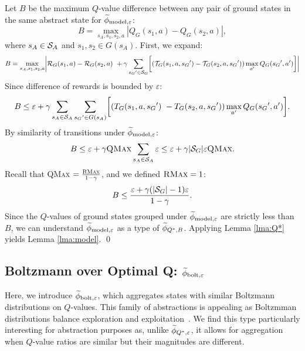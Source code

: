 Let $B$ be the maximum $Q$-value difference between any pair of ground states in the same abstract state for $\widetilde \phi_{\text{model},\varepsilon}$:
\begin{equation*}
B = \max_{s_A, s_1, s_2, a}  |Q_G(s_1, a) - Q_G(s_2, a)|,
\end{equation*}
where $s_A \in \mathcal{S}_A$ and $s_1, s_2 \in G(s_A)$. First, we expand:
\begin{equation}
B=\max_{s_A, s_1, s_2, a}      \biggl|\mathcal{R}_G(s_1, a) - \mathcal{R}_G(s_2, a)\ + \gamma \sum_{{s_G}' \in \mathcal{S}_G} \biggl[(\mathcal{T}_G(s_1,a,{s_G}') -\mathcal{T}_G(s_2, a, {s_G}'))\max_{a'}Q_G({s_G}', a')\biggr]\biggr|
\end{equation}
Since difference of rewards is bounded by $\varepsilon$:
\begin{equation}
B\leq \varepsilon + \gamma \sum_{s_A \in \mathcal{S}_A}\sum_{{s_G}' \in G(s_A)} \biggl[(T_G(s_1, a, {s_G}')\ - T_G(s_2, a, {s_G}')) \max_{a'}Q_G({s_G}', a') \biggr].
\end{equation}
By similarity of transitions under $\widetilde \phi_{\text{model},\varepsilon}$:
\begin{align*}
B \leq \varepsilon + \gamma \textsc{QMax} \sum_{s_A \in \mathcal{S}_A} \varepsilon \leq \varepsilon + \gamma|\mathcal{S}_G|\varepsilon \textsc{QMax}.
\end{align*}
Recall that \textsc{QMax} $= \frac{\textsc{RMax}}{1-\gamma}$, and we defined $\textsc{RMax} = 1$:
\begin{equation*}
B \leq \frac{\varepsilon + \gamma(|\mathcal{S}_G| - 1) \varepsilon}{1-\gamma}.
\end{equation*}
Since the $Q$-values of ground states grouped under $\widetilde \phi_{\text{model},\varepsilon}$ are strictly less than $B$, we can understand $\widetilde \phi_{\text{model},\varepsilon}$ as a type of $\widetilde \phi_{Q^*,B}$. Applying Lemma \ref{lma:Q*} yields Lemma \ref{lma:model}.
\qed

\subsection{Boltzmann over Optimal Q: $\widetilde \phi_{\text{bolt},\varepsilon}$}
\label{sec:boltz}

Here, we introduce $\widetilde \phi_{\text{bolt},\varepsilon}$, which aggregates states with similar Boltzmann distributions on $Q$-values. This family of abstractions is appealing as Boltzmman distributions balance exploration and exploitation~\cite{sutton1998reinforcement}. We find this type particularly interesting for abstraction purposes as, unlike $\widetilde \phi_{Q^*,\varepsilon}$, it allows for aggregation when $Q$-value ratios are similar but their magnitudes are different.

